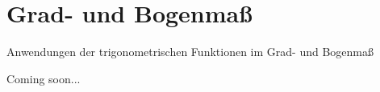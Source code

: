
\section{Grad- und Bogenmaß}

Anwendungen der trigonometrischen Funktionen im Grad- und Bogenmaß

Coming soon...
